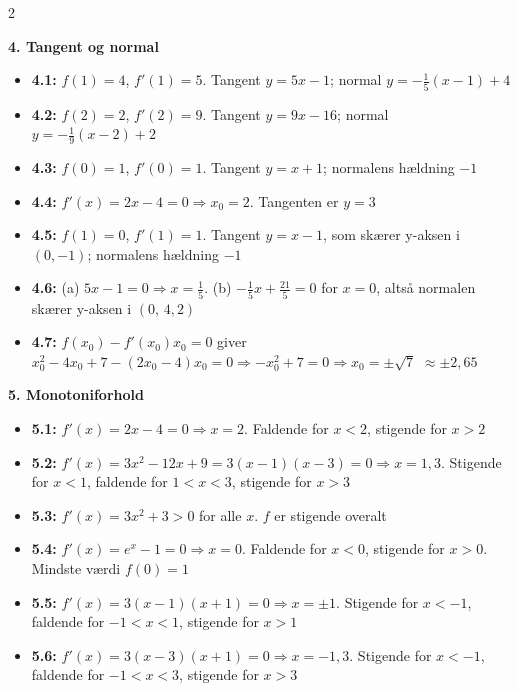 \documentclass[11pt,a4paper]{article}
\begin{document}
\begin{multicols}{2}
\columnbreak

\noindent\textbf{4. Tangent og normal}
\begin{itemize}[leftmargin=1.3em, itemsep=1pt, topsep=2pt]
  \item \textbf{4.1:} $f(1) = 4$, $f'(1) = 5$. Tangent $y = 5x - 1$;
        normal $y = -\tfrac{1}{5}(x-1) + 4$
  \item \textbf{4.2:} $f(2) = 2$, $f'(2) = 9$. Tangent $y = 9x - 16$;
        normal $y = -\tfrac{1}{9}(x-2) + 2$
  \item \textbf{4.3:} $f(0) = 1$, $f'(0) = 1$. Tangent $y = x + 1$;
        normalens hældning $-1$
  \item \textbf{4.4:} $f'(x) = 2x - 4 = 0 \Rightarrow x_{0} = 2$.
        Tangenten er $y = 3$
  \item \textbf{4.5:} $f(1) = 0$, $f'(1) = 1$. Tangent $y = x - 1$, som
        skærer y-aksen i $(0,-1)$; normalens hældning $-1$
  \item \textbf{4.6:} (a) $5x - 1 = 0 \Rightarrow x = \tfrac{1}{5}$.
        (b) $-\tfrac{1}{5}x + \tfrac{21}{5} = 0$ for $x = 0$, altså
        normalen skærer y-aksen i $(0,\,4{,}2)$
  \item \textbf{4.7:} $f(x_{0}) - f'(x_{0})x_{0} = 0$ giver
        $x_{0}^{2} - 4x_{0} + 7 - (2x_{0}-4)x_{0} = 0
        \Rightarrow -x_{0}^{2} + 7 = 0 \Rightarrow x_{0} = \pm\sqrt{7}$
        $\approx \pm 2{,}65$
\end{itemize}

\noindent\textbf{5. Monotoniforhold}
\begin{itemize}[leftmargin=1.3em, itemsep=1pt, topsep=2pt]
  \item \textbf{5.1:} $f'(x) = 2x - 4 = 0 \Rightarrow x = 2$.
        Faldende for $x < 2$, stigende for $x > 2$
  \item \textbf{5.2:} $f'(x) = 3x^{2}-12x+9 = 3(x-1)(x-3) = 0
        \Rightarrow x = 1, 3$. Stigende for $x < 1$, faldende for
        $1 < x < 3$, stigende for $x > 3$
  \item \textbf{5.3:} $f'(x) = 3x^{2}+3 > 0$ for alle $x$.
        $f$ er stigende overalt
  \item \textbf{5.4:} $f'(x) = e^{x} - 1 = 0 \Rightarrow x = 0$.
        Faldende for $x < 0$, stigende for $x > 0$.
        Mindste værdi $f(0) = 1$
  \item \textbf{5.5:} $f'(x) = 3(x-1)(x+1) = 0 \Rightarrow x = \pm 1$.
        Stigende for $x < -1$, faldende for $-1 < x < 1$, stigende for $x > 1$
  \item \textbf{5.6:} $f'(x) = 3(x-3)(x+1) = 0 \Rightarrow x = -1, 3$.
        Stigende for $x < -1$, faldende for $-1 < x < 3$, stigende for $x > 3$
\end{itemize}


\end{multicols}
\end{document}
